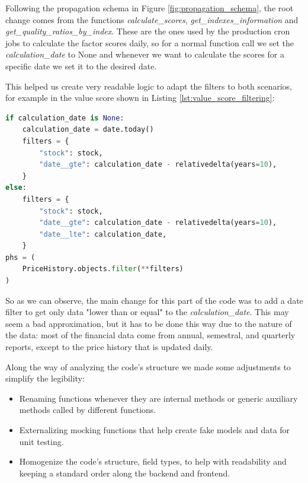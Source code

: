 \documentclass[11pt,english,a4paper,hidelinks]{book}
\begin{document}
\vspace{0.5cm}
\noindent Following the propagation schema in Figure \ref{fig:propagation_schema}, the root change comes from the functions \textit{calculate\_scores}, \textit{get\_indexes\_information} and \textit{get\_quality\_ratios\_by\_index}. These are the ones used by the production cron jobs to calculate the factor scores daily, so for a normal function call we set the \textit{calculation\_date} to None and whenever we want to calculate the scores for a specific date we set it to the desired date. 

\vspace{0.5cm}
\noindent This helped us create very readable logic to adapt the filters to both scenarios, for example in the value score shown in Listing \ref{lst:value_score_filtering}:

\begin{lstlisting}[language=Python, caption={Value Score Filtering}, label={lst:value_score_filtering}]
if calculation_date is None:
    calculation_date = date.today()
    filters = {
        "stock": stock,
        "date__gte": calculation_date - relativedelta(years=10),
    }
else:
    filters = {
        "stock": stock,
        "date__gte": calculation_date - relativedelta(years=10),
        "date__lte": calculation_date,
    }
phs = (
    PriceHistory.objects.filter(**filters)
)
\end{lstlisting}

\noindent So as we can observe, the main change for this part of the code was to add a date filter to get only data "lower than or equal" to the \textit{calculation\_date}. This may seem a bad approximation, but it has to be done this way due to the nature of the data: most of the financial data come from annual, semestral, and quarterly reports, except to the price history that is updated daily.

\vspace{0.5cm}
\noindent Along the way of analyzing the code's structure we made some adjustments to simplify the legibility:
\begin{itemize}
    \item Renaming functions whenever they are internal methods or generic auxiliary methods called by different functions.
    \item Externalizing mocking functions that help create fake models and data for unit testing.
    \item Homogenize the code's structure, field types, to help with readability and keeping a standard order along the backend and frontend.
\end{itemize}
\end{document}
